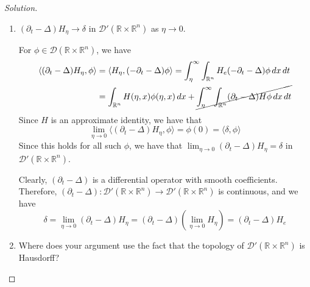 \documentclass[12pt]{article}
\DeclareMathOperator{\supp}{supp}
\newenvironment{solution}{\begin{proof}[Solution]}{\end{proof}}
\begin{document}
\begin{enumerate}[label=(\alph*)]
\begin{solution}
\begin{enumerate}[label=(\roman*)]
		Let $\phi\in \mathcal{D}(\mathbb{R}\times \mathbb{R}^n)$, and let $\epsilon > 0$. Choose $\eta>0$ so that $\eta < \frac{\epsilon}{\left|\left|\phi \right|\right|_{L^\infty}}$. Assume that $\supp \phi\subset [-T,T]\times\overline{B(0,R)}$, where $0<T,R<\infty$. Then,
		\begin{equation}
			\begin{aligned}
				\left| \langle H_\eta,\phi\rangle - \langle H_e,\phi\rangle \right|&= \left| \int (H_\eta-H_e)\phi\,dm \right| = \left| \int_{0}^\eta \int_{\overline{B(0,R)}} -H_e\phi\,dx\,dt \right| \\
				&\leq \left|\left|\phi \right|\right|_{L^\infty} \int_{0}^\eta \int_{\mathbb{R}^n} H_e\,dx\,dt = \left|\left|\phi \right|\right|_{L^\infty} \lim_{\delta\to 0^+} \int_{\delta}^\eta \int_{\mathbb{R}^n} H\,dx\,dt \\
				&= \left|\left|\phi \right|\right|_{L^\infty} \eta \\
				& < \epsilon
			\end{aligned}
		\end{equation}
		So, $H_\eta\to H_e$ in as $\eta\to 0$.
		\newpage 
		\item $(\partial_t-\Delta)H_\eta \to \delta$ in $\mathcal{D}'(\mathbb{R}\times \mathbb{R}^n)$ as $\eta\to 0$.
		
		For $\phi\in \mathcal{D}(\mathbb{R}\times \mathbb{R}^n)$, we have
		\begin{equation}
			\begin{aligned}
				\langle (\partial_t-\Delta)H_\eta,\phi\rangle &= \langle H_\eta,(-\partial_t-\Delta)\phi\rangle = \int_{\eta}^\infty \int_{\mathbb{R}^n} H_e(-\partial_t-\Delta)\phi\,dx\,dt \\
				&= \int_{\mathbb{R}^n} H(\eta,x)\phi(\eta,x)\,dx + \cancel{\int_{\eta}^\infty \int_{\mathbb{R}^n} (\partial_t-\Delta)H\phi\,dx\,dt}
			\end{aligned}
		\end{equation}
		Since $H$ is an approximate identity, we have that 
		\begin{equation}\label{Delta}
			\lim_{\eta\to 0} \langle (\partial_t-\Delta)H_\eta,\phi\rangle = \phi(0) = \langle \delta,\phi\rangle
		\end{equation}
		Since this holds for all such $\phi$, we have that $\lim_{\eta\to 0}(\partial_t-\Delta)H_\eta = \delta$ in $\mathcal{D}'(\mathbb{R}\times \mathbb{R}^n).$
		
		Clearly, $(\partial_t-\Delta)$ is a differential operator with smooth coefficients. Therefore, $(\partial_t-\Delta):\mathcal{D}'(\mathbb{R}\times \mathbb{R}^n)\to \mathcal{D}'(\mathbb{R}\times \mathbb{R}^n)$ is continuous, and we have
		\begin{equation}
			\delta = \lim_{\eta\to 0}(\partial_t-\Delta )H_\eta = (\partial_t-\Delta)(\lim_{\eta\to 0}H_\eta) = (\partial_t-\Delta)H_e
		\end{equation}
		\item Where does your argument use the fact that the topology of $\mathcal{D}'(\mathbb{R}\times \mathbb{R}^n)$ is Hausdorff?
		

\end{enumerate}
\end{solution}
\end{enumerate}
\end{document}
